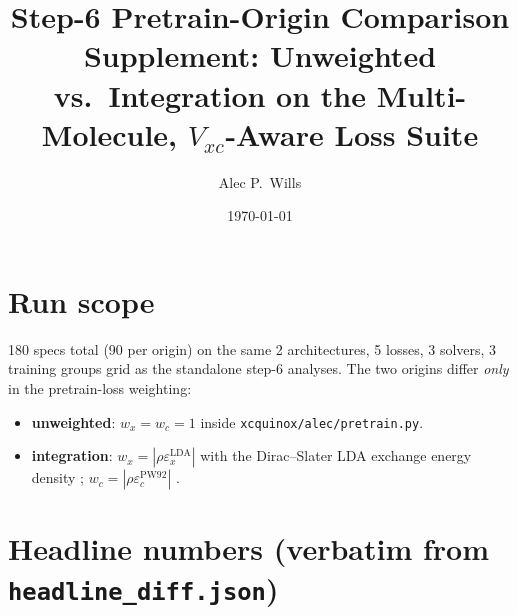 \documentclass[11pt,letterpaper]{article}
\title{Step-6 Pretrain-Origin Comparison Supplement: Unweighted vs.\ Integration
  on the Multi-Molecule, $V_{xc}$-Aware Loss Suite}
\author{Alec P.\ Wills}
\date{\today}
\begin{document}
\maketitle

\section*{Run scope}
180 specs total (90 per origin) on the same 2 architectures, 5 losses, 3 solvers,
3 training groups grid as the standalone step-6 analyses. The two origins differ
\emph{only} in the pretrain-loss weighting:

\begin{itemize}
\item \textbf{unweighted}: $w_x \!=\! w_c \!=\! 1$ inside
  \texttt{xcquinox/alec/pretrain.py}.
\item \textbf{integration}: $w_x \!=\! |\rho \varepsilon_x^{\text{LDA}}|$ with
  the Dirac--Slater LDA exchange energy density
  \citep{Dirac1930,Slater1951}; $w_c \!=\! |\rho \varepsilon_c^{\text{PW92}}|$
  \citep{PerdewWang1992}.
\end{itemize}

\section{Headline numbers (verbatim from \texttt{headline\_diff.json})}
\end{document}
